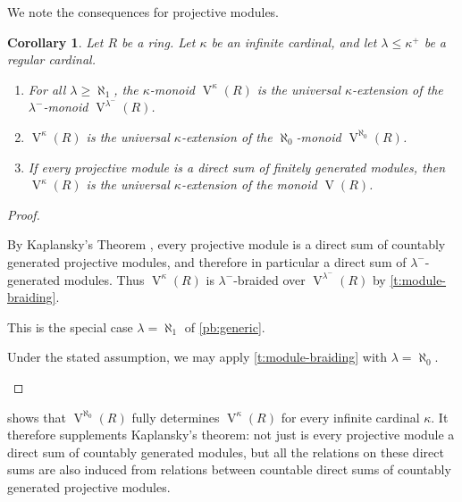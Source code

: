 \documentclass[a4paper,11pt,oneside]{amsart}
\newtheorem{cor}[teor]{Corollary}
\theoremstyle{remark}
\DeclareMathOperator{\Vmon}{V}
\begin{document}
We note the consequences for projective modules.

\begin{cor} \label{cor:projective-braided}
  Let $R$ be a ring.
  Let $\kappa$ be an infinite cardinal, and let $\lambda \le \kappa^+$ be a regular cardinal.
  \begin{enumerate}
  \item \label{pb:generic} For all $\lambda \ge \aleph_1$, the $\kappa$-monoid $\Vmon^\kappa(R)$ is the universal $\kappa$-extension of the $\lambda^-$-monoid $\Vmon^{\lambda^-}(R)$.
  \item \label{pb:countable} $\Vmon^{\kappa}(R)$ is the universal $\kappa$-extension of the $\aleph_0$-monoid $\Vmon^{\aleph_0}(R)$.
  \item \label{pb:fg} If every projective module is a direct sum of finitely generated modules, then $\Vmon^{\kappa}(R)$ is the universal $\kappa$-extension of the monoid $\Vmon(R)$.
  \end{enumerate}
\end{cor}

\begin{proof}
  \begin{proofenumerate}
  \item[\ref{pb:generic}]
  By Kaplansky's Theorem \cite{Kaplansky58}, every projective module is a direct sum of countably generated projective modules, and therefore in particular a direct sum of $\lambda^-$-generated modules.
  Thus $\Vmon^{\kappa}(R)$ is $\lambda^-$-braided over $\Vmon^{\lambda^-}(R)$ by \cref{t:module-braiding}.

  \item[\ref{pb:countable}]
  This is the special case $\lambda=\aleph_1$ of \ref{pb:generic}.

  \item[\ref{pb:fg}]
  Under the stated assumption, we may apply \cref{t:module-braiding} with $\lambda=\aleph_0$. \qedhere
  \end{proofenumerate}
\end{proof}

 shows that $\Vmon^{\aleph_0}(R)$ fully determines $\Vmon^{\kappa}(R)$ for every infinite cardinal $\kappa$.
It therefore supplements Kaplansky's theorem: not just is every projective module a direct sum of countably generated modules, but all the relations on these direct sums are also induced from relations between countable direct sums of countably generated projective modules.
\end{document}
